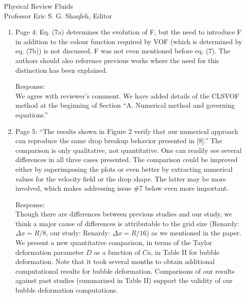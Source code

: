 \documentclass{letter}
\begin{document}
\begin{letter}{
Physical Review Fluids\\
Professor Eric S. G. Shaqfeh, Editor\\}
\begin{enumerate}
Response: \\
Following to reviewer's comment, we have provided an additional explanation
``The surface tension force expressed by the singular Heaviside gradient term
acts only on the gas-liquid interface.''
\\
Please see the 5th line from the top of Page 4.
\\

\par\noindent
\item
\textsf
{Page 4: Eq. (7a) determines the evolution of F, but the need to introduce F in
addition to the colour function required by VOF (which is determined by eq.
(7b)) is not discussed. F was not even mentioned before eq. (7). The authors
should also reference previous works where the need for this distinction has
been explained.}
\vspace{3 mm}

Response: \\
We agree with reviewer's comment. We have added details of the CLSVOF method at
the beginning of Section ``A. Numerical method and governing equations.''
\\

\par\noindent
\item
\textsf
{Page 5: ``The results shown in Figure 2 verify that our numerical approach can
reproduce the same drop breakup behavior presented in [8].'' The comparison is
only qualitative, not quantitative. One can readily see several differences in
all three cases presented.  The comparison could be improved either by
superimposing the plots or even better by extracting numerical values for the
velocity field or the drop shape. The latter may be more involved, which makes
addressing issue \#7 below even more important.}
\vspace{3 mm}

Response: \\
Though there are differences between previous studies and our study, 
we think a major cause of differences is attributable to the grid size 
(Renardy: $\Delta x =R/8$, our study: Renardy: $\Delta x =R/16$) as we 
mentioned in the paper.
{\color{red}
We present a new quantitative comparison, in terms of the Taylor deformation
parameter $D$ as a function of $Ca$, in Table I\hspace{-1.2pt}I for bubble
deformation.  Note that it took several months to obtain additional
computational results for bubble deformation.  Comparisons of our results
against past studies (summarized in Table I\hspace{-1.2pt}I) support the
validity of our bubble deformation computations.
}
\\


\end{enumerate}
\end{letter}
\end{document}
